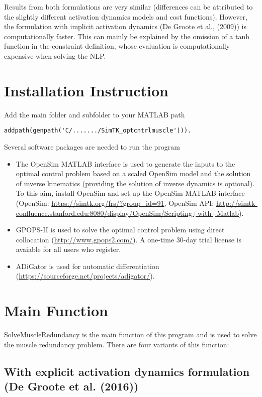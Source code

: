 \documentclass[a4paper,oneside,11pt]{article}
\begin{document}
Results from both formulations are very similar (differences can be attributed to the slightly different activation dynamics models and cost functions). However, the formulation with implicit activation dynamics (De Groote et al., (2009)) is computationally faster. This can mainly be explained by the omission of a tanh function in the constraint definition, whose evaluation is computationally expensive when solving the NLP.


\section{Installation Instruction}

Add the main folder and subfolder to your MATLAB path 
\begin{lstlisting}
addpath(genpath('C/......./SimTK_optcntrlmuscle'))).
\end{lstlisting}

Several software packages are needed to run the program
\begin{itemize}
	\item The OpenSim MATLAB interface is used to generate the inputs to the optimal control problem based on a scaled OpenSim model and the solution of inverse kinematics (providing the solution of inverse dynamics is optional). To this aim, install OpenSim and set up the OpenSim MATLAB interface (OpenSim: \url{https://simtk.org/frs/?group_id=91}, OpenSim API: \url{http://simtk-confluence.stanford.edu:8080/display/OpenSim/Scripting+with+Matlab}).
	\item GPOPS-II is used to solve the optimal control problem using direct collocation (\url{http://www.gpops2.com/}). A one-time 30-day trial license is avaiable for all users who register.
	\item ADiGator is used for automatic differentiation (\url{https://sourceforge.net/projects/adigator/}).
\end{itemize}

\section{Main Function}

SolveMuscleRedundancy is the main function of this program and is used to solve the muscle redundancy problem. There are four variants of this function:

\subsection{With explicit activation dynamics formulation (De Groote et al. (2016))}
\end{document}
